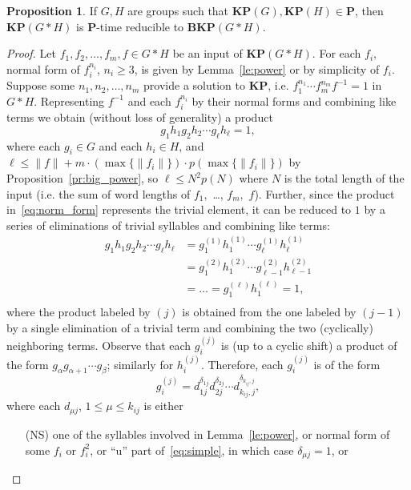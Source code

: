 \documentclass[10pt]{amsart}
\theoremstyle{definition}
\newtheorem{proposition}[theorem]{Proposition}
\def\P{{\mathbf{P}}}
\def\BKP{{\mathbf{BKP}}}
\def\KP{{\mathbf{KP}}}
\begin{document}
\begin{proposition}\label{pr:kp_to_bkp}
If $G,H$ are groups such that $\KP(G),\KP(H)\in\P$, then $\KP(G*H)$ is $\P$-time reducible to $\BKP(G*H)$.
\end{proposition}
\begin{proof}
Let $f_1,f_2,\ldots,f_m,f\in G*H$ be an input of $\KP(G*H)$. For each $f_i$, normal form of $f_i^{n_i}$, $n_i\ge 3$, is given by Lemma~\ref{le:power} or by simplicity of $f_i$. Suppose some $n_1,n_2,\ldots,n_m$ provide a solution to $\KP$, i.e. $f_1^{n_1}\cdots f_m^{n_m}f^{-1}=1$ in $G*H$. Representing $f^{-1}$ and each $f_i^{n_i}$ by their normal forms and combining like terms we obtain (without loss of generality) a product
\begin{equation}\label{eq:norm_form}
g_1h_1g_2h_2\cdots g_\ell h_\ell=1,
\end{equation}
where each $g_i\in G$ and each $h_i\in H$, and $\ell\le \|f\|+m\cdot (\max\{\|f_i\|\})\cdot p(\max\{\|f_i\|\})$ by Proposition~\ref{pr:big_power}, so $\ell\le N^2p(N)$ where $N$ is the total length of the input (i.e. the sum of word lengths of $f_1,$ \ldots, $f_m,$ $f$). Further, since the product in~\eqref{eq:norm_form} represents the trivial element, it can be reduced to $1$ by a series of eliminations of trivial syllables and combining like terms:
\begin{align*}
g_1h_1g_2h_2\cdots g_\ell h_\ell&=g_1^{(1)}h_1^{(1)}\cdots g_\ell^{(1)}h_\ell^{(1)}\\
&=g_1^{(2)}h_1^{(2)}\cdots g_{\ell-1}^{(2)}h_{\ell-1}^{(2)}\\
&=\ldots=g_1^{(\ell)}h_1^{(\ell)}=1,\\
\end{align*}
where the product labeled by $(j)$ is obtained from the one labeled by $(j-1)$ by a single elimination of a trivial term and combining the two (cyclically) neighboring terms. Observe that each $g_i^{(j)}$ is (up to a cyclic shift) a product of the form $g_\alpha g_{\alpha+1}\cdots g_\beta$; similarly for $h_i^{(j)}$. Therefore, each $g_i^{(j)}$ is of the form
\begin{equation}\label{eq:g_ij}
g_i^{(j)}=d_{1j}^{\delta_{1j}} d_{2j}^{\delta_{2j}}\cdots d_{k_{ij},j}^{\delta_{k_{ij},j}},
\end{equation}
where each $d_{\mu j}$, $1\le \mu\le k_{ij}$ is either
\begin{itemize}
\item[(NS)] one of the syllables involved in Lemma~\ref{le:power}, or normal form of some  $f_i$ or $f_i^2$, or ``u'' part of~\eqref{eq:simple}, in which case $\delta_{\mu j}=1$, or

\end{itemize}
\end{proof}
\end{document}
